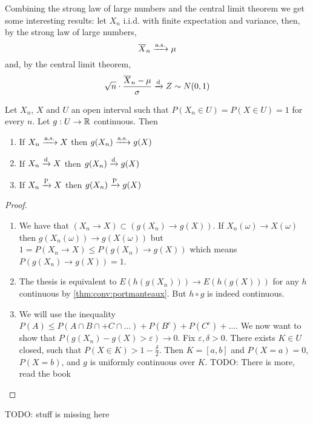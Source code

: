\documentclass[12pt]{extarticle}
\newcommand{\convas}{\xrightarrow{\operatorfont a.s.}}
\newcommand{\convdist}{\xrightarrow{\operatorfont d}}
\newcommand{\convprob}{\xrightarrow{\operatorfont P}}
\begin{document}
Combining the strong law of large numbers and the central limit theorem we get some interesting results:
let $X_n$ i.i.d. with finite expectation and variance, then, by the strong law of large numbers,
\begin{equation}
    \overline X_n \convas \mu
\end{equation}
and, by the central limit theorem,
\begin{equation}
    \sqrt{n} \cdot \frac{\overline X_n - \mu}{\sigma} \convdist Z \sim N(0, 1)
\end{equation}

\begin{theorem}
    Let $X_n$, $X$ and $U$ an open interval such that $P(X_n \in U) = P(X \in U) = 1$ for every $n$.
    Let $g: U \to \mathbb{R}$ continuous.
    Then
    \begin{enumerate}
        \item If $X_n \convas X$ then $g(X_n) \convas g(X)$
        \item If $X_n \convdist X$ then $g(X_n) \convdist g(X)$
        \item If $X_n \convprob X$ then $g(X_n) \convprob g(X)$
    \end{enumerate}
\end{theorem}
\begin{proof}
    \skiplineafterproof
    \begin{enumerate}
        \item We have that $(X_n \to X) \subset (g(X_n) \to g(X))$.
              If $X_n(\omega) \to X(\omega)$ then $g(X_n(\omega)) \to g(X(\omega))$ but
              $1 = P(X_n \to X) \leq P(g(X_n) \to g(X))$ which means $P(g(X_n) \to g(X)) = 1$.
        \item The thesis is equivalent to $E(h(g(X_n))) \to E(h(g(X)))$ for any $h$ continuous by \autoref{thm:conv:portmanteaux}. But $h \circ g$ is indeed continuous.
        \item We will use the inequality $P(A) \leq P(A \cap B \cap + C \cap \dots) + P(B^c) + P(C^c) + \dots$.
              We now want to show that $P(g(X_n) - g(X) > \varepsilon) \to 0$.
              Fix $\varepsilon, \delta > 0$. There exists $K \in U$ closed, such that $P(X \in K) > 1- \frac{\delta}{2}$.
              Then $K = [a, b]$ and $P(X = a) = 0$, $P(X = b)$, and $g$ is uniformly continuous over $K$.
              TODO: There is more, read the book
    \end{enumerate}
\end{proof}

TODO: stuff is missing here
\end{document}
